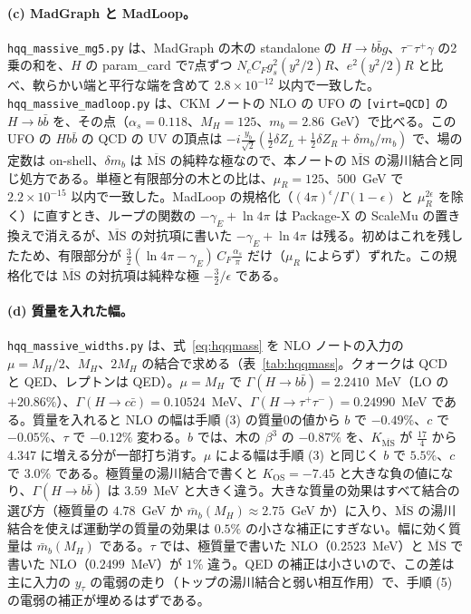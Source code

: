 \documentclass[a4paper,10pt]{ltjsarticle}
\newcommand{\MSbar}{\overline{\mathrm{MS}}}
\begin{document}
\paragraph{(c) MadGraph と MadLoop。}\texttt{hqq\_massive\_mg5.py} は、MadGraph の木の standalone の $H\to b\bar bg$、$\tau^-\tau^+\gamma$ の2乗の和を、$H$ の param\_card で7点ずつ $N_cC_Fg_s^2(y^2/2)R$、$e^2(y^2/2)R$ と比べ、軟らかい端と平行な端を含めて $2.8\times10^{-12}$ 以内で一致した。\texttt{hqq\_massive\_madloop.py} は、CKM ノートの NLO の UFO の \texttt{[virt=QCD]} の $H\to b\bar b$ を、その点（$\alpha_s=0.118$、$M_H=125$、$m_b=2.86$~GeV）で比べる。この UFO の $Hb\bar b$ の QCD の UV の頂点は $-i\frac{y_b}{\sqrt2}(\frac12\delta Z_L+\frac12\delta Z_R+\delta m_b/m_b)$ で、場の定数は on-shell、$\delta m_b$ は $\MSbar$ の純粋な極なので、本ノートの $\MSbar$ の湯川結合と同じ処方である。単極と有限部分の木との比は、$\mu_R=125$、$500$~GeV で $2.2\times10^{-15}$ 以内で一致した。MadLoop の規格化（$(4\pi)^\epsilon/\Gamma(1-\epsilon)$ と $\mu_R^{2\epsilon}$ を除く）に直すとき、ループの関数の $-\gamma_E+\ln4\pi$ は Package-X の ScaleMu の置き換えで消えるが、$\MSbar$ の対抗項に書いた $-\gamma_E+\ln4\pi$ は残る。初めはこれを残したため、有限部分が $\frac32(\ln4\pi-\gamma_E)\,C_F\frac{\alpha_s}\pi$ だけ（$\mu_R$ によらず）ずれた。この規格化では $\MSbar$ の対抗項は純粋な極 $-\frac32/\epsilon$ である。

\paragraph{(d) 質量を入れた幅。}\texttt{hqq\_massive\_widths.py} は、式~\eqref{eq:hqqmass} を NLO ノートの入力の $\mu=M_H/2$、$M_H$、$2M_H$ の結合で求める（表~\ref{tab:hqqmass}。クォークは QCD と QED、レプトンは QED）。$\mu=M_H$ で $\Gamma(H\to b\bar b)=2.2410$~MeV（LO の $+20.86\%$）、$\Gamma(H\to c\bar c)=0.10524$~MeV、$\Gamma(H\to\tau^+\tau^-)=0.24990$~MeV である。質量を入れると NLO の幅は手順 (3) の質量0の値から $b$ で $-0.49\%$、$c$ で $-0.05\%$、$\tau$ で $-0.12\%$ 変わる。$b$ では、木の $\beta^3$ の $-0.87\%$ を、$K_{\MSbar}$ が $\frac{17}4$ から $4.347$ に増える分が一部打ち消す。$\mu$ による幅は手順 (3) と同じく $b$ で $5.5\%$、$c$ で $3.0\%$ である。極質量の湯川結合で書くと $K_{\mathrm{OS}}=-7.45$ と大きな負の値になり、$\Gamma(H\to b\bar b)$ は $3.59$~MeV と大きく違う。大きな質量の効果はすべて結合の選び方（極質量の $4.78$~GeV か $\bar m_b(M_H)\approx2.75$~GeV か）に入り、$\MSbar$ の湯川結合を使えば運動学の質量の効果は $0.5\%$ の小さな補正にすぎない。幅に効く質量は $\bar m_b(M_H)$ である。$\tau$ では、極質量で書いた NLO（$0.2523$~MeV）と $\MSbar$ で書いた NLO（$0.2499$~MeV）が $1\%$ 違う。QED の補正は小さいので、この差は主に入力の $y_\tau$ の電弱の走り（トップの湯川結合と弱い相互作用）で、手順 (5) の電弱の補正が埋めるはずである。
\end{document}
